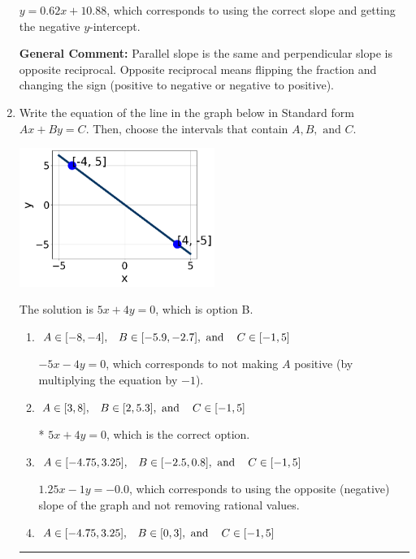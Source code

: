 \documentclass{extbook}[14pt]
\newcommand{\litem}[1]{\item #1

\rule{\textwidth}{0.4pt}}
\begin{document}
\begin{enumerate}
{\begin{enumerate}[label=\Alph*.]
 $y = 0.62x + 10.88$, which corresponds to using the correct slope and getting the negative $y$-intercept.
\end{enumerate}

\textbf{General Comment:} Parallel slope is the same and perpendicular slope is opposite reciprocal. Opposite reciprocal means flipping the fraction and changing the sign (positive to negative or negative to positive).
}
\litem{
Write the equation of the line in the graph below in Standard form $Ax+By=C$. Then, choose the intervals that contain $A, B, \text{ and } C$.

\begin{center}
    \includegraphics[width=0.5\textwidth]{../Figures/linearGraphToStandardCopyA.png}
\end{center}


The solution is \( 5x + 4y = 0 \), which is option B.\begin{enumerate}[label=\Alph*.]
\item \( A \in [-8, -4], \hspace{3mm} B \in [-5.9, -2.7], \text{ and } \hspace{3mm} C \in [-1, 5] \)

 $-5x - 4y = 0$, which corresponds to not making $A$ positive (by multiplying the equation by $-1$).
\item \( A \in [3, 8], \hspace{3mm} B \in [2, 5.3], \text{ and } \hspace{3mm} C \in [-1, 5] \)

* $5x + 4y = 0$, which is the correct option.
\item \( A \in [-4.75, 3.25], \hspace{3mm} B \in [-2.5, 0.8], \text{ and } \hspace{3mm} C \in [-1, 5] \)

 $1.25x - 1y = -0.0$, which corresponds to using the opposite (negative) slope of the graph and not removing rational values.
\item \( A \in [-4.75, 3.25], \hspace{3mm} B \in [0, 3], \text{ and } \hspace{3mm} C \in [-1, 5] \)


\end{enumerate}}
\end{enumerate}
\end{document}
